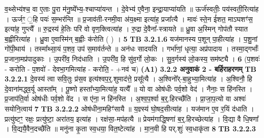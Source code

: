 \documentclass[17pt]{extarticle}
\begin{document}
{{{{{{{{{{{{{{{{{{{                  व॒थ्सेभ्य॑श्च॒ वा ए॒ताः पु॒रा म॑नु॒ष्ये᳚भ्य॒-श्चाप्या॑यन्त । दे॒वेभ्य॑ ए॒वैना॒ इन्द्रा॒याप्या॑यति ॥ ऊर्ज॑स्वतीः॒ पय॑स्वती॒रित्या॑ह । ऊर्जꣳ॒ ॒हि पयः॑ स॒म्भर॑न्ति ॥ प्र॒जाव॑ती-रनमी॒वा अ॑य॒क्ष्मा इत्या॑ह॒ प्रजा᳚त्यै । मावः॑ स्ते॒न ई॑शत॒ माऽघशꣳ॑स॒ इत्या॑ह॒ गुप्त्यै᳚ ॥ रु॒द्रस्य॑ हे॒तिः परि॑ वो वृण॒क्त्वित्या॑ह । रु॒द्रा दे॒वैना᳚-स्त्रायते ॥ ध्रु॒वा अ॒स्मिन् गोप॑तौ स्यात ब॒ह्वीरित्या॑ह । ध्रु॒वा ए॒वास्मि॑न् ब॒ह्वीः क॑रोति ( ) । \textbf{ 5} \newline
                  \newline
                                \textbf{ TB 3.2.1.6} \newline
                  यज॑मानस्य प॒शून् पा॒हीत्या॑ह । प॒शु॒नां गो॑पी॒थाय॑ । तस्मा᳚थ्सा॒यं प॒शव॒ उप॑ स॒माव॑र्तन्ते ॥ अन॑धः सादयति । गर्भा॑णां॒ धृत्या॒ अप्र॑पादाय । तस्मा॒द्गर्भाः᳚ प्र॒जाना॒मप्र॑पादुकाः । उ॒परी॑व॒ निद॑धाति । उ॒परी॑व॒ हि सु॑व॒र्गो लो॒कः । सु॒व॒र्गस्य॑ लो॒कस्य॒ सम॑ष्ट्यै । \textbf{ 6} \newline
                  \newline
                                    (प॒शवः॑ - करोति - प॒शवो॑ - देवभा॒गमित्या॑ह - करोति॒ - +नव॑ च) \textbf{(A1)} \newline \newline
                \textbf{ 3.2.2     अनुवाकं   2 - बर्हिराहरणम्} \newline
                                \textbf{ TB 3.2.2.1} \newline
                  दे॒वस्य॑ त्वा सवि॒तुः प्र॑स॒व इत्य॑श्वप॒र्॒.शुमाद॑त्ते॒ प्रसू᳚त्यै । अ॒श्विनो᳚र्-बा॒हुभ्या॒मित्या॑ह । अ॒श्विनौ॒ हि दे॒वाना॑मद्ध्व॒र्यू आस्ता᳚म् । पू॒ष्णो हस्ता᳚भ्या॒मित्या॑ह॒ यत्यै᳚ ॥ यो वा ओष॑धीः पर्व॒शो वेद॑ । नैनाः॒ स हि॑नस्ति । प्र॒जाप॑ति॒र्वा ओष॑धीः पर्व॒शो वे॑द । स ए॑ना॒ न हि॑नस्ति । अ॒श्व॒प॒र्श्वा ब॒र्॒.हिरच्छै॑ति । प्रा॒जा॒प॒त्यो वा अश्वः॑ सयोनि॒त्वाय॑ \textbf{ 7} \newline
                  \newline
                                \textbf{ TB 3.2.2.2} \newline
                  ओष॑धीना॒महिꣳ॑सायै ॥ य॒ज्ञ्स्य॑ घो॒षद॒सीत्या॑ह । यज॑मान ए॒व र॒यिं द॑धाति । प्रत्यु॑ष्टꣳ॒॒ रक्षः॒ प्रत्यु॑ष्टा॒ अरा॑तय॒ इत्या॑ह । रक्ष॑सा॒-मप॑हत्यै ॥ प्रेयम॑गाद्धि॒षणा॑ ब॒र्॒.हिरच्छेत्या॑ह । वि॒द्या वै धि॒षणा᳚ । वि॒द्ययै॒वैन॒दच्छै॑ति ॥ मनु॑ना कृ॒ता स्व॒धया॒ वित॒ष्टेत्या॑ह । मा॒न॒वी हि पर्.शुः॑ स्व॒धाकृ॑ता \textbf{ 8} \newline
                  \newline
                                \textbf{ TB 3.2.2.3} \newline
}}}}}}}}}}}}}}}}}}}
\end{document}
